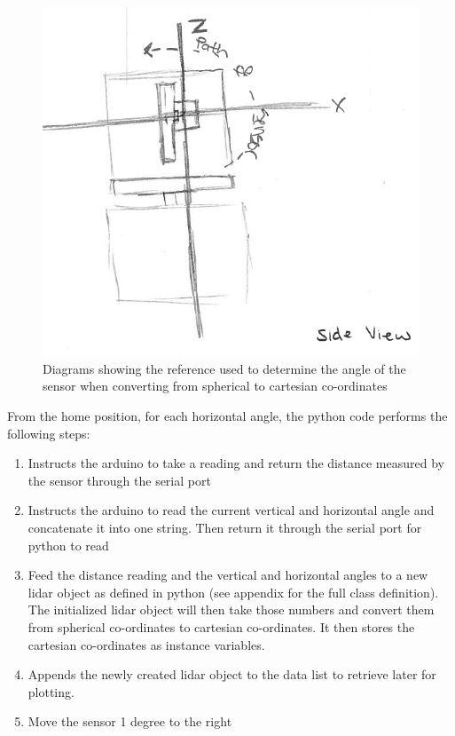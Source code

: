\documentclass{article}
\begin{document}
\begin{figure}[h!]
\begin{center}
\includegraphics[scale=0.3]{SideView.PNG}
\caption{Diagrams showing the reference used to determine the angle of the sensor when converting from spherical to cartesian co-ordinates}
\end{center}
\end{figure}

From the home position, for each horizontal angle, the python code performs the following steps:

\begin{enumerate}
\item Instructs the arduino to take a reading and return the distance measured by the sensor through the serial port
\item Instructs the arduino to read the current vertical and horizontal angle and concatenate it into one string. Then return it through the serial port for python to read
\item Feed the distance reading and the vertical and horizontal angles to a new lidar object as defined in python (see appendix for the full class definition). The initialized lidar object will then take those numbers and convert them from spherical co-ordinates to cartesian co-ordinates. It then stores the cartesian co-ordinates as instance variables.
\item Appends the newly created lidar object to the data list to retrieve later for plotting.
\item Move the sensor 1 degree to the right
\end{enumerate}
\end{document}
